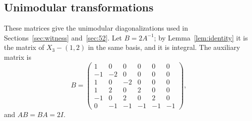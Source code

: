 \documentclass[11pt]{article}
\theoremstyle{remark}
\begin{document}
\bigskip
\begin{appendices}
\makeatletter
\renewcommand{\@seccntformat}[1]{\@ifundefined{#1name}{}{\csname #1name\endcsname\ }\csname the#1\endcsname\enspace}
\makeatother

\section{Unimodular transformations}\label{app:certificates}
These matrices give the unimodular diagonalizations used in Sections~\ref{sec:witness} and~\ref{sec:52}.
Let
$B=2A^{-1}$; by Lemma~\ref{lem:identity} it is the matrix of $X_3-(1,2)$ in
the same basis, and it is integral.
The auxiliary matrix is
\[
B=\begin{pmatrix}
 1& 0& 0& 0& 0& 0\\
-1&-2& 0& 0& 0& 0\\
 1& 0&-2& 0& 0& 0\\
 1& 2& 0& 2& 0& 0\\
-1& 0& 2& 0& 2& 0\\
 0&-1&-1&-1&-1&-1
\end{pmatrix},
\]
and $AB=BA=2I$.


\end{appendices}
\end{document}
